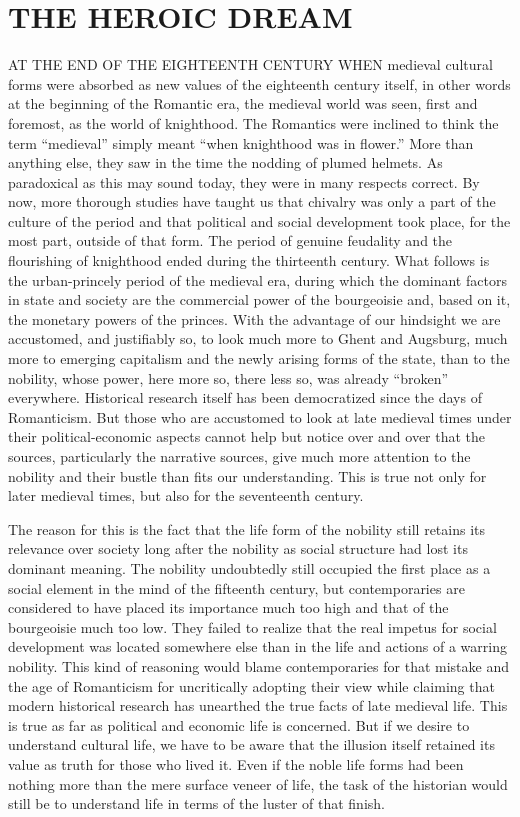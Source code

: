 \chapter{THE HEROIC DREAM}

AT THE END OF THE EIGHTEENTH CENTURY WHEN medieval cultural forms were
absorbed as new values of the eighteenth century itself, in other words
at the beginning of the Romantic era, the medieval world was seen, first
and foremost, as the world of knighthood. The Romantics were inclined to
think the term ``medieval'' simply meant ``when knighthood was in
flower.'' More than anything else, they saw in the time the nodding of
plumed helmets. As paradoxical as this may sound today, they were in
many respects correct. By now, more thorough studies have taught us that
chivalry was only a part of the culture of the period and that political
and social development took place, for the most part, outside of that
form. The period of genuine feudality and the flourishing of knighthood
ended during the thirteenth century. What follows is the urban-princely
period of the medieval era, during which the dominant factors in state
and society are the commercial power of the bourgeoisie and, based on
it, the monetary powers of the princes. With the advantage of our
hindsight we are accustomed, and justifiably so, to look much more to
Ghent and Augsburg, much more to emerging capitalism and the newly
arising forms of the state, than to the nobility, whose power, here more
so, there less so, was already ``broken'' everywhere. Historical
research itself has been democratized since the days of Romanticism. But
those who are accustomed to look at late medieval times under their
political-economic aspects cannot help but notice over and over that the
sources, particularly the narrative sources, give much more attention to
the nobility and their bustle than fits our understanding. This is true
not only for later medieval times, but also for the seventeenth century.

The reason for this is the fact that the life form of the nobility still
retains its relevance over society long after the nobility as social
structure had lost its dominant meaning. The nobility undoubtedly
\protect\hypertarget{10_Chapter_Three__THE_HEROIC_DREAM.xhtmlux5cux23page_62}{}{}still
occupied the first place as a social element in the mind of the
fifteenth century, but contemporaries are considered to have placed its
importance much too high and that of the bourgeoisie much too low. They
failed to realize that the real impetus for social development was
located somewhere else than in the life and actions of a warring
nobility. This kind of reasoning would blame contemporaries for that
mistake and the age of Romanticism for uncritically adopting their view
while claiming that modern historical research has unearthed the true
facts of late medieval life. This is true as far as political and
economic life is concerned. But if we desire to understand cultural
life, we have to be aware that the illusion itself retained its value as
truth for those who lived it. Even if the noble life forms had been
nothing more than the mere surface veneer of life, the task of the
historian would still be to understand life in terms of the luster of
that finish.

